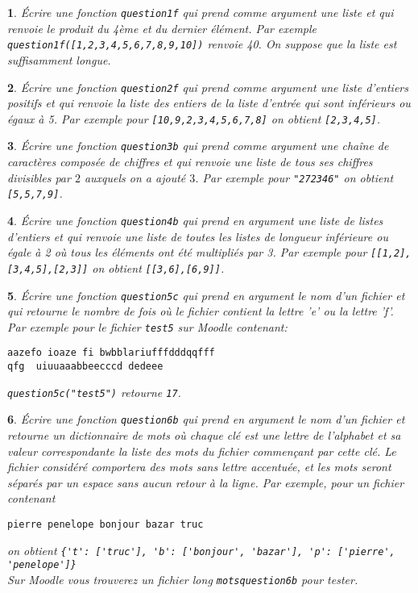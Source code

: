 \documentclass[10pt]{article}
\newtheorem{exi}{}
\newenvironment{exo}{\begin{exi}\em}{\end{exi}}
\begin{document}
\begin{exo}Écrire une fonction {\tt question1f} qui prend comme argument une liste et
qui renvoie le produit du 4ème et du dernier élément. Par exemple
\verb+question1f([1,2,3,4,5,6,7,8,9,10])+ renvoie 40.
On suppose que la liste est suffisamment longue.
\end{exo}
\vspace*{-2ex}
\begin{exo}Écrire une fonction {\tt question2f} qui prend comme argument une liste d'entiers positifs et qui renvoie la liste des entiers de la liste d'entrée qui sont
inférieurs ou égaux à 5. Par exemple pour \verb+[10,9,2,3,4,5,6,7,8]+
on obtient \verb+[2,3,4,5]+.
\end{exo}
\vspace*{-2ex}
\begin{exo}Écrire une fonction {\tt question3b} qui prend comme argument une chaîne de
caractères composée de chiffres
et qui renvoie une liste de tous ses chiffres divisibles par $2$
auxquels on a ajouté $3$. Par
exemple pour \verb+"272346"+ on obtient \verb+[5,5,7,9]+.
\end{exo}
\vspace*{-2ex}
\begin{exo}Écrire une fonction {\tt question4b} qui prend en argument une liste de listes d'entiers et qui renvoie une liste de toutes les listes
de longueur inférieure ou égale à 2 où tous les éléments ont été multipliés par 3. Par exemple pour \verb+[[1,2],[3,4,5],[2,3]]+ on obtient \verb+[[3,6],[6,9]]+.
\end{exo}
\vspace*{-2ex}
\begin{exo}Écrire une fonction {\tt question5c} qui prend en argument le nom d'un fichier et qui retourne le nombre de fois où le fichier contient la lettre 'e' ou la
lettre 'f'.
Par exemple pour le fichier \verb+test5+ sur Moodle contenant: 
\begin{verbatim} 
aazefo ioaze fi bwbblariufffdddqqfff
qfg  uiuuaaabbeecccd dedeee
\end{verbatim} 
\verb+question5c("test5")+ retourne \verb+17+.
\end{exo}
\vspace*{-2ex}
\begin{exo}Écrire une fonction \verb+question6b+ qui prend en argument le nom d'un fichier
et retourne un dictionnaire de mots où chaque clé est une lettre de
l'alphabet et sa valeur correspondante la liste des mots du fichier commençant
par cette clé. Le fichier considéré comportera des mots sans lettre accentuée, et les mots seront séparés par un espace sans aucun retour
à la ligne.
Par exemple, pour un fichier contenant
\begin{verbatim}
pierre penelope bonjour bazar truc
\end{verbatim}
on obtient \verb+{'t': ['truc'], 'b': ['bonjour', 'bazar'], 'p': ['pierre', 'penelope']}+\\
Sur Moodle vous trouverez un fichier long \verb+motsquestion6b+ pour tester.
\end{exo}
\end{document}
